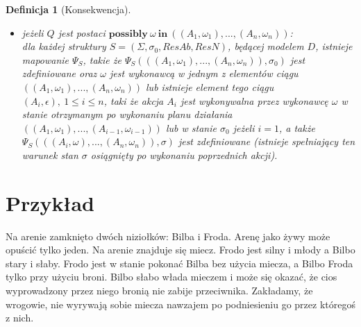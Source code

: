 \documentclass[11pt,a4paper]{article}
\newtheorem{definition}{Definicja}[section]
\begin{document}
\begin{definition}[Konsekwencja]
\begin{itemize}
    	 \item jeżeli $Q$ jest postaci $\mathbf{possibly}~\omega~\mathbf{in}~((A_1, \omega_1),...,(A_n,\omega_n))$: \\
    	 dla każdej struktury $S=(\Sigma, \sigma_0, ResAb, ResN)$, będącej modelem $D$, istnieje mapowanie $\Psi_S$, takie że $\Psi_S(((A_1, \omega_1), ..., (A_n, \omega_n)), \sigma_0)$ jest zdefiniowane oraz $\omega$ jest wykonawcą w jednym z elementów ciągu $((A_1, \omega_1),...,(A_n,\omega_n))$ lub istnieje element tego ciągu $(A_i, \epsilon),~1 \leq i \leq n$, taki że akcja $A_i$ jest wykonywalna przez wykonawcę $\omega$ w stanie otrzymanym po wykonaniu planu działania $((A_1, \omega_1),...,(A_{i-1},\omega_{i-1}))$ lub w stanie $\sigma_0$ jeżeli $i=1$, a także $\Psi_S(((A_i, \omega), ..., (A_n, \omega_n)), \sigma)$ jest zdefiniowane (istnieje spełniający ten warunek stan $\sigma$ osiągnięty po wykonaniu poprzednich akcji).
    \end{itemize}
    \end{definition}
    
    \section{Przykład}
    
    Na arenie zamknięto dwóch niziołków: Bilba i Froda. Arenę jako żywy może opuścić tylko jeden. Na arenie znajduje się miecz. Frodo jest silny i młody a Bilbo stary i słaby. Frodo jest w stanie pokonać Bilba bez użycia miecza, a Bilbo Froda tylko przy użyciu broni. Bilbo słabo włada mieczem i może się okazać, że cios wyprowadzony przez niego bronią nie zabije przeciwnika. Zakładamy, że wrogowie, nie wyrywają sobie miecza nawzajem po podniesieniu go przez któregoś z nich.
    
\end{document}
